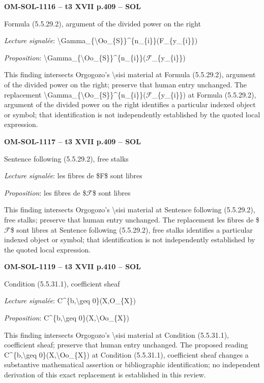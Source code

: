 \par\noindent\textbf{OM-SOL-1116 -- t3 XVII p.409 -- SOL}\par
Formula (5.5.29.2), argument of the divided power on the right\par
\emph{Lecture signalée}: \textbackslash{}Gamma\_\{\textbackslash{}Oo\_\{S\}\}\textasciicircum{}\{n\_\{i\}\}(F\_\{y\_\{i\}\})\par
\emph{Proposition}: \textbackslash{}Gamma\_\{\textbackslash{}Oo\_\{S\}\}\textasciicircum{}\{n\_\{i\}\}(\ensuremath{\mathcal{F}}\_\{y\_\{i\}\})\par
This finding intersects Orgogozo's \textbackslash{}sisi material at Formula (5.5.29.2), argument of the divided power on the right; preserve that human entry unchanged. The replacement \textbackslash{}Gamma\_\{\textbackslash{}Oo\_\{S\}\}\textasciicircum{}\{n\_\{i\}\}(\ensuremath{\mathcal{F}}\_\{y\_\{i\}\}) at Formula (5.5.29.2), argument of the divided power on the right identifies a particular indexed object or symbol; that identification is not independently established by the quoted local expression.\par
\par\noindent\textbf{OM-SOL-1117 -- t3 XVII p.409 -- SOL}\par
Sentence following (5.5.29.2), free stalks\par
\emph{Lecture signalée}: les fibres de \$F\$ sont libres\par
\emph{Proposition}: les fibres de \$\ensuremath{\mathcal{F}}\$ sont libres\par
This finding intersects Orgogozo's \textbackslash{}sisi material at Sentence following (5.5.29.2), free stalks; preserve that human entry unchanged. The replacement les fibres de \$\ensuremath{\mathcal{F}}\$ sont libres at Sentence following (5.5.29.2), free stalks identifies a particular indexed object or symbol; that identification is not independently established by the quoted local expression.\par
\par\noindent\textbf{OM-SOL-1119 -- t3 XVII p.410 -- SOL}\par
Condition (5.5.31.1), coefficient sheaf\par
\emph{Lecture signalée}: C\textasciicircum{}\{b,\textbackslash{}geq 0\}(X,O\_\{X\})\par
\emph{Proposition}: C\textasciicircum{}\{b,\textbackslash{}geq 0\}(X,\textbackslash{}Oo\_\{X\})\par
This finding intersects Orgogozo's \textbackslash{}sisi material at Condition (5.5.31.1), coefficient sheaf; preserve that human entry unchanged. The proposed reading C\textasciicircum{}\{b,\textbackslash{}geq 0\}(X,\textbackslash{}Oo\_\{X\}) at Condition (5.5.31.1), coefficient sheaf changes a substantive mathematical assertion or bibliographic identification; no independent derivation of this exact replacement is established in this review.\par
